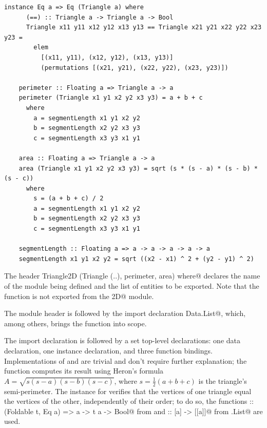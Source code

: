 \documentclass[UdineBachThesis,american,11pt]{PhdThesis}
\begin{document}
  \pagebreak

  \begin{lstlisting}[gobble=4,basicstyle=\ttfamily\small]
    instance Eq a => Eq (Triangle a) where
      (==) :: Triangle a -> Triangle a -> Bool
      Triangle x11 y11 x12 y12 x13 y13 == Triangle x21 y21 x22 y22 x23 y23 =
        elem
          [(x11, y11), (x12, y12), (x13, y13)]
          (permutations [(x21, y21), (x22, y22), (x23, y23)])

    perimeter :: Floating a => Triangle a -> a
    perimeter (Triangle x1 y1 x2 y2 x3 y3) = a + b + c
      where
        a = segmentLength x1 y1 x2 y2
        b = segmentLength x2 y2 x3 y3
        c = segmentLength x3 y3 x1 y1

    area :: Floating a => Triangle a -> a
    area (Triangle x1 y1 x2 y2 x3 y3) = sqrt (s * (s - a) * (s - b) * (s - c))
      where
        s = (a + b + c) / 2
        a = segmentLength x1 y1 x2 y2
        b = segmentLength x2 y2 x3 y3
        c = segmentLength x3 y3 x1 y1

    segmentLength :: Floating a => a -> a -> a -> a -> a
    segmentLength x1 y1 x2 y2 = sqrt ((x2 - x1) ^ 2 + (y2 - y1) ^ 2)
  \end{lstlisting}

  The header
  \lstinline@module Triangle2D (Triangle (..), perimeter, area) where@ declares
  the name of the module being defined and the list of entities to be exported.
  Note that the function \lstinline@segmentLength@ is not exported from the
  \lstinline@Triangle2D@ module.

  The module header is followed by the import declaration
  \lstinline@import Data.List@, which, among others, brings the function
  \lstinline@permutations@ into scope.

  The import declaration is followed by a set top-level declarations: one data
  declaration, one instance declaration, and three function bindings.
  Implementations of \lstinline@perimeter@ and \lstinline@segmentLength@ are
  trivial and don't require further explanation; the \lstinline@area@ function
  computes its result using Heron's formula
  $A = \sqrt{s \left(s - a\right) \left(s - b\right) \left(s - c\right)}$, where
  $s = \frac{1}{2} \left(a + b + c\right)$ is the triangle's semi-perimeter. The
  \lstinline@Eq@ instance for \lstinline@Triangle@ verifies that the vertices of
  one triangle equal the vertices of the other, independently of their order;
  to do so, the functions
  \lstinline@elem :: (Foldable t, Eq a) => a -> t a -> Bool@ from
  \lstinline@Prelude@ and \lstinline@permutations :: [a] -> [[a]]@ from
  \lstinline@Data.List@ are used.
\end{document}
